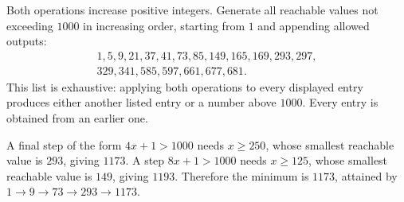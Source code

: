 Both operations increase positive integers. Generate all reachable values not exceeding $1000$ in increasing order, starting from $1$ and appending allowed outputs:
\[
\begin{gathered}
1,5,9,21,37,41,73,85,149,165,169,293,297,\\
329,341,585,597,661,677,681.
\end{gathered}
\]
This list is exhaustive: applying both operations to every displayed entry produces either another listed entry or a number above $1000$. Every entry is obtained from an earlier one.

A final step of the form $4x+1>1000$ needs $x\ge250$, whose smallest reachable value is $293$, giving $1173$. A step $8x+1>1000$ needs $x\ge125$, whose smallest reachable value is $149$, giving $1193$. Therefore the minimum is $\boxed{1173}$, attained by $1\to9\to73\to293\to1173$.
